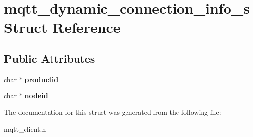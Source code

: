 \hypertarget{structmqtt__dynamic__connection__info__s}{}\section{mqtt\+\_\+dynamic\+\_\+connection\+\_\+info\+\_\+s Struct Reference}
\label{structmqtt__dynamic__connection__info__s}
\subsection*{Public Attributes}
\begin{DoxyCompactItemize}
\item 
\mbox{\label{structmqtt__dynamic__connection__info__s_ab1039c9dd0b89f0d869d89786adef20d}} 
char $\ast$ {\bfseries productid}
\item 
\mbox{\label{structmqtt__dynamic__connection__info__s_a6ac9a25f3ff77d21ee07f60048c2b0e3}} 
char $\ast$ {\bfseries nodeid}
\end{DoxyCompactItemize}


The documentation for this struct was generated from the following file\+:\begin{DoxyCompactItemize}
\item 
mqtt\+\_\+client.\+h\end{DoxyCompactItemize}
